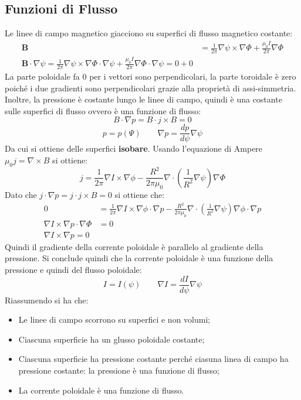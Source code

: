 \documentclass{article}
\begin{document}
\subsection{Funzioni di Flusso}
Le linee di campo magnetico giacciono su superfici di flusso magnetico costante:
\begin{align*}
    \mathbf{B}&=\frac{1}{2\pi }\nabla\psi\times\nabla\Phi+\frac{\mu_{0}I}{2\pi }\nabla\Phi \\
    \mathbf{B}\cdot\nabla\psi=\frac{1}{2\pi }\nabla\psi\times\nabla\Phi\cdot\nabla\psi+\frac{\mu_{0}I}{2\pi }\nabla\Phi\cdot\nabla\psi=0+0
\end{align*}
La parte poloidale fa 0 per i vettori sono perpendicolari, la parte toroidale è zero poiché i due gradienti sono perpendicolari grazie alla proprietà di assi-simmetria.
Inoltre, la pressione è costante lungo le linee di campo, quindi è una costante sulle superfici di flusso ovvero è una funzione di flusso:\begin{equation*}
    B\cdot\nabla p=B\cdot j\times B=0
\end{equation*}
\begin{equation*}
    p=p(\Psi)\quad\quad \nabla p=\frac{dp}{d\psi}\nabla\psi
\end{equation*}
Da cui si ottiene delle superfici \textbf{isobare}.
Usando l'equazione di Ampere \(\mu_{0}j=\nabla\times B\) si ottiene:\begin{equation*}
    j=\frac{1}{2\pi}\nabla I\times \nabla\phi-\frac{R^{2}}{2\pi\mu_{0}}\nabla\cdot\left(\frac{1}{R^{2}}\nabla \psi\right)\nabla\Phi
\end{equation*}
Dato che \(j\cdot\nabla p=j\cdot j\times B=0\) si ottiene che:\begin{align*}
    0&=\frac{1}{2\pi}\nabla I\times \nabla\phi\cdot\nabla p-\frac{R^{2}}{2\pi\mu_{0}}\nabla\cdot\left(\frac{1}{R^{2}}\nabla\psi\right)\nabla\phi\cdot\nabla p\\
    \nabla I\times\nabla p\cdot\nabla\Phi&=0\\
    \nabla I\times\nabla p=0
\end{align*}
Quindi il gradiente della corrente poloidale è parallelo al gradiente della pressione. Si conclude quindi che la corrente poloidale è una funzione della pressione e quindi del flusso poloidale:\begin{equation*}
    I=I(\psi)\quad\quad \nabla I=\frac{dI}{d\psi}\nabla\psi
\end{equation*}
Riassumendo si ha che:\begin{itemize}
    \item Le linee di campo scorrono su superfici e non volumi;
    \item Ciascuna superficie ha un glusso poloidale costante;
    \item Ciascuna superficie ha pressione costante perché ciasuna linea di campo ha pressione costante: la pressione è una funzione di flusso;
    \item La corrente poloidale è una funzione di flusso.
\end{itemize}
\end{document}
